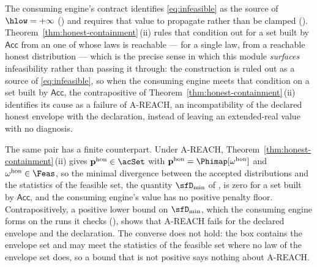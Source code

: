 
\begin{remark}
\label{rem:hlow-consequence}
The consuming engine's contract identifies \eqref{eq:infeasible} as the source of
$\hlow=+\infty$ () and requires that value to
propagate rather than be clamped ().
Theorem~\ref{thm:honest-containment}\,(ii) rules that
condition out for a set built by $\mathsf{Acc}$ from an
 one of whose laws is reachable --- for a single law,
from a reachable honest distribution --- which is the precise sense in which
this module \emph{surfaces} infeasibility rather than passing it through: the
construction is ruled out as a source of \eqref{eq:infeasible}, so when the
consuming engine meets that condition on a set built by $\mathsf{Acc}$, the
contrapositive of Theorem~\ref{thm:honest-containment}\,(ii) identifies its
cause as a failure of A-REACH, an incompatibility of the declared honest
envelope with the declaration, instead of leaving an extended-real value with
no diagnosis.

The same pair has a finite counterpart. Under A-REACH,
Theorem~\ref{thm:honest-containment}\,(ii) gives
$\mathbf{p}^{\mathrm{hon}}\in\acSet$ with
$\mathbf{p}^{\mathrm{hon}}=\Phimap[\omega^{\mathrm{hon}}]$ and
$\omega^{\mathrm{hon}}\in\Feas$, so the minimal divergence between the
accepted distributions and the statistics of the feasible set, the quantity
$\sfD_{\min}$ of , is zero for a set
built by $\mathsf{Acc}$, and the consuming engine's value has no positive
penalty floor. Contrapositively, a positive lower bound on $\sfD_{\min}$,
which the consuming engine forms on the runs it checks
(), shows that A-REACH fails
for the declared envelope and the declaration. The converse does not hold:
the box contains the envelope set and may meet the statistics of the
feasible set where no law of the envelope set does, so a bound that is not
positive says nothing about A-REACH.


\end{remark}
